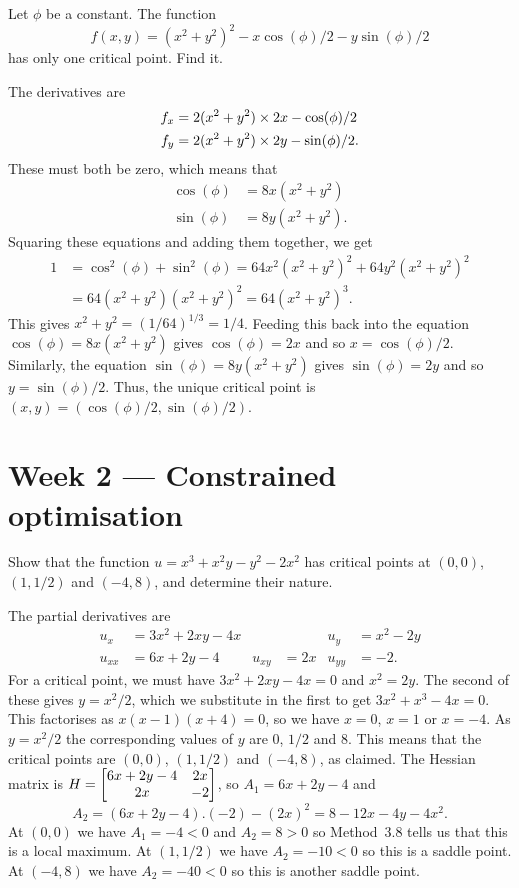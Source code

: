 \documentclass[a4paper]{amsart}
\renewenvironment{solution}{\SolutionInline}{\endSolutionInline}
\begin{document}
\begin{exercise}
 Let $\phi$ be a constant.  The function 
 \[ f(x,y)=(x^2+y^2)^2-x\cos(\phi)/2-y\sin(\phi)/2 \]
 has only one critical point.  Find it.
\end{exercise}
\begin{solution}
 The derivatives are
 \begin{align*}
  f_x &= 2(x^2+y^2)\times 2x - \cos(\phi)/2 \\
  f_y &= 2(x^2+y^2)\times 2y - \sin(\phi)/2.
 \end{align*}
 These must both be zero, which means that
 \begin{align*}
  \cos(\phi) &= 8x(x^2+y^2) \\
  \sin(\phi) &= 8y(x^2+y^2).
 \end{align*}
 Squaring these equations and adding them together, we get
 \begin{align*}
  1 &= \cos^2(\phi)+\sin^2(\phi) 
     = 64x^2(x^2+y^2)^2 + 64y^2(x^2+y^2)^2 \\
    &= 64 (x^2+y^2)(x^2+y^2)^2 = 64(x^2+y^2)^3.
 \end{align*}
 This gives $x^2+y^2=(1/64)^{1/3}=1/4$.  Feeding this back into the
 equation $\cos(\phi)=8x(x^2+y^2)$ gives $\cos(\phi)=2x$ and so
 $x=\cos(\phi)/2$.  Similarly, the equation $\sin(\phi)=8y(x^2+y^2)$
 gives $\sin(\phi)=2y$ and so $y=\sin(\phi)/2$.  Thus, the unique
 critical point is $(x,y)=(\cos(\phi)/2,\sin(\phi)/2)$.
\end{solution}

\section*{Week 2 --- Constrained optimisation}

\begin{exercise}
 Show that the function $u=x^3+x^2y-y^2-2x^2$ has critical points at
 $(0,0)$, $(1,1/2)$ and $(-4,8)$, and determine their nature.
\end{exercise}
\begin{solution}
 The partial derivatives are
 \begin{align*}
   u_x &= 3x^2+2xy-4x &&& u_y &= x^2-2y \\
   u_{xx} &= 6x+2y-4 & u_{xy} &= 2x & u_{yy} &= -2. 
 \end{align*}
 For a critical point, we must have $3x^2+2xy-4x=0$ and $x^2=2y$.  The
 second of these gives $y=x^2/2$, which we substitute in the first to
 get $3x^2+x^3-4x=0$.  This factorises as $x(x-1)(x+4)=0$, so we have
 $x=0$, $x=1$ or $x=-4$.  As $y=x^2/2$ the corresponding values of $y$
 are $0$, $1/2$ and $8$.  This means that the critical points are
 $(0,0)$, $(1,1/2)$ and $(-4,8)$, as claimed.  The Hessian matrix
 is $H=\left[\begin{matrix} 6x+2y-4 & 2x \\ 2x & -2\end{matrix}\right]$, so $A_1=6x+2y-4$ and  
 \[ A_2=(6x+2y-4).(-2)-(2x)^2= 8-12x-4y-4x^2. \]
 At $(0,0)$ we have $A_1=-4<0$ and $A_2=8>0$ so Method~3.8 tells us that
 this is a local maximum.  At $(1,1/2)$ we have $A_2=-10<0$ so this is
 a saddle point.  At $(-4,8)$ we have $A_2=-40<0$ so this is another
 saddle point.  
\end{solution}
\end{document}
